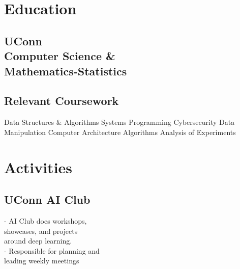 \documentclass[]{resume-template}
\begin{document}
%
%
\lastupdated{}

%
%

%
%

\begin{minipage}[t]{0.33\textwidth}


    \section{Education}\label{sec:education}

    \subsection{UConn\\ Computer Science \&\\
        Mathematics-Statistics}\label{subsec:uconn}
    \vspace{\topsep}
    \subsection{Relevant Coursework}\label{subsec:coursework}
    Data Structures \& Algorithms \textbullet{} Systems Programming \textbullet{} Cybersecurity
    Data Manipulation \textbullet{}  Computer Architecture \textbullet{} Algorithms \textbullet{} Analysis of Experiments
    \sectionsep{}




    \section{Activities}\label{sec:activities}

    \subsection{UConn AI Club}\label{subsec:uconn-ai-club}
    - AI Club does workshops,\\showcases, and projects \\around deep learning.\\
    - Responsible for planning and\\ leading weekly meetings\\
    \vspace{\topsep}



\end{minipage}
\end{document}
